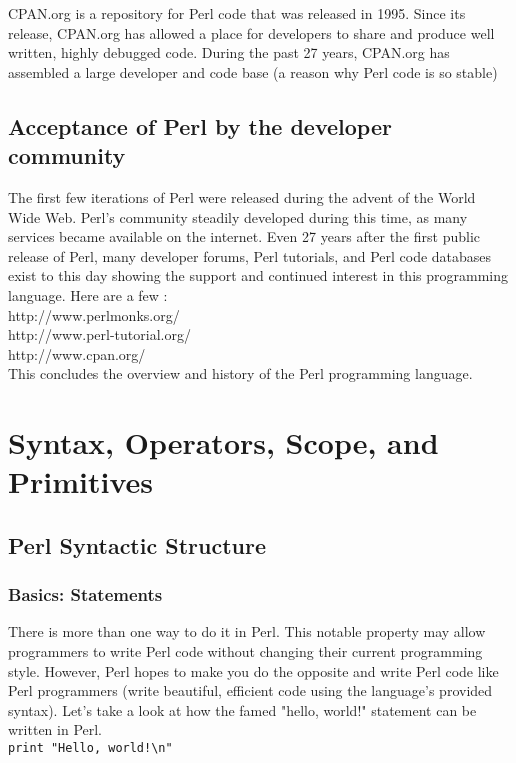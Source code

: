\documentclass[11pt,a4paper]{article}
\begin{document}
\noindent CPAN.org is a repository for Perl code that was released in 1995. Since its release, CPAN.org has allowed a place for developers to share and produce well written, highly debugged code. During the past 27 years, CPAN.org has assembled a large developer and code base (a reason why Perl code is so stable)\\
\subsection{Acceptance of Perl by the developer community}
The first few iterations of Perl were released during the advent of the World Wide Web\cite{07}. Perl's community steadily developed during this time, as many services became available on the internet. Even 27 years after the first public release of Perl, many developer forums, Perl tutorials, and Perl code databases exist to this day showing the support and continued interest in this programming language. Here are a few : \\

\indent http://www.perlmonks.org/\\
\indent http://www.perl-tutorial.org/\\
\indent http://www.cpan.org/\\

\noindent This concludes the overview and history of the Perl programming language.

\newpage
\section{Syntax, Operators, Scope, and Primitives}
\subsection{Perl Syntactic Structure}
        \subsubsection{Basics: Statements}
There is more than one way to do it in Perl. This notable property may allow programmers to write Perl code without changing their current programming style. However, Perl hopes to make you do the opposite and write Perl code like Perl programmers (write beautiful, efficient code using the language's provided syntax). Let's take a look at how the famed "hello, world!" statement can be written in Perl.\\

\texttt{print "Hello, world!\textbackslash n"}\\
\end{document}
